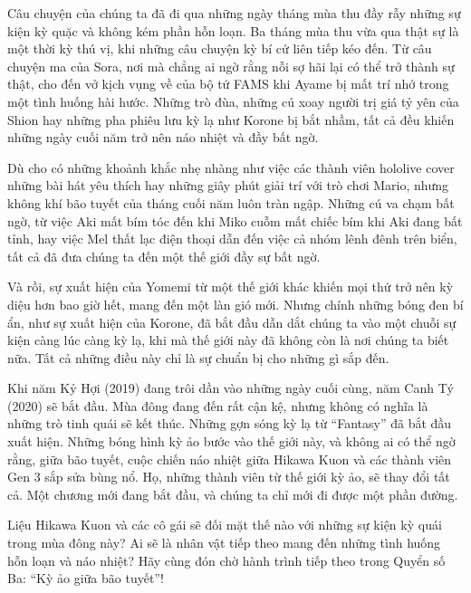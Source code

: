 \documentclass[main.tex]{subfiles}
\begin{document}
Câu chuyện của chúng ta đã đi qua những ngày tháng mùa thu đầy rẫy những sự kiện kỳ quặc và không kém phần hỗn loạn. Ba tháng mùa thu vừa qua thật sự là một thời kỳ thú vị, khi những câu chuyện kỳ bí cứ liên tiếp kéo đến. Từ câu chuyện ma của Sora, nơi mà chẳng ai ngờ rằng nỗi sợ hãi lại có thể trở thành sự thật, cho đến vở kịch vụng về của bộ tứ FAMS khi Ayame bị mất trí nhớ trong một tình huống hài hước. Những trò đùa, những cú xoay người trị giá tỷ yên của Shion hay những pha phiêu lưu kỳ lạ như Korone bị bắt nhầm, tất cả đều khiến những ngày cuối năm trở nên náo nhiệt và đầy bất ngờ.

Dù cho có những khoảnh khắc nhẹ nhàng như việc các thành viên hololive cover những bài hát yêu thích hay những giây phút giải trí với trò chơi Mario, nhưng không khí bão tuyết của tháng cuối năm luôn tràn ngập. Những cú va chạm bất ngờ, từ việc Aki mất bím tóc đến khi Miko cuỗm mất chiếc bím khi Aki đang bất tỉnh, hay việc Mel thất lạc điện thoại dẫn đến việc cả nhóm lênh đênh trên biển, tất cả đã đưa chúng ta đến một thế giới đầy sự bất ngờ.

Và rồi, sự xuất hiện của Yomemi từ một thế giới khác khiến mọi thứ trở nên kỳ diệu hơn bao giờ hết, mang đến một làn gió mới. Nhưng chính những bóng đen bí ẩn, như sự xuất hiện của Korone, đã bắt đầu dẫn dắt chúng ta vào một chuỗi sự kiện càng lúc càng kỳ lạ, khi mà thế giới này đã không còn là nơi chúng ta biết nữa. Tất cả những điều này chỉ là sự chuẩn bị cho những gì sắp đến.

Khi năm Kỷ Hợi (2019) đang trôi dần vào những ngày cuối cùng, năm Canh Tý (2020) sẽ bắt đầu. Mùa đông đang đến rất cận kệ, nhưng không có nghĩa là những trò tinh quái sẽ kết thúc. Những gợn sóng kỳ lạ từ ``Fantasy'' đã bắt đầu xuất hiện. Những bóng hình kỳ ảo bước vào thế giới này, và không ai có thể ngờ rằng, giữa bão tuyết, cuộc chiến náo nhiệt giữa Hikawa Kuon và các thành viên Gen 3 sắp sửa bùng nổ. Họ, những thành viên từ thế giới kỳ ảo, sẽ thay đổi tất cả. Một chương mới đang bắt đầu, và chúng ta chỉ mới đi được một phần đường.

Liệu Hikawa Kuon và các cô gái sẽ đối mặt thế nào với những sự kiện kỳ quái trong mùa đông này? Ai sẽ là nhân vật tiếp theo mang đến những tình huống hỗn loạn và náo nhiệt? Hãy cùng đón chờ hành trình tiếp theo trong Quyển số Ba: ``Kỳ ảo giữa bão tuyết''!
\end{document}
